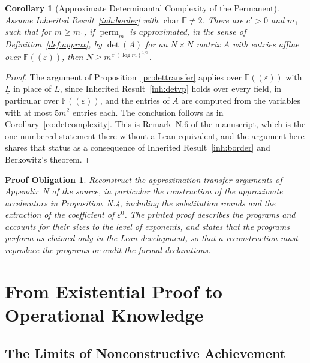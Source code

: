\documentclass[11pt,letterpaper]{report}
\theoremstyle{plain}
\newtheorem{corollary}[theorem]{Corollary}
\newtheorem{obligation}[theorem]{Proof Obligation}
\theoremstyle{definition}
\theoremstyle{remark}
\DeclareMathOperator{\perm}{perm}
\begin{document}
\begin{corollary}[Approximate Determinantal Complexity of the Permanent]\label{co:borderdet}
Assume Inherited Result~\ref{inh:border} with $\operatorname{char}\mathbb F\ne2$. There are $c'>0$ and $m_1$ such that for $m\ge m_1$, if $\perm_m$ is approximated, in the sense of Definition~\ref{def:approx}, by $\det(A)$ for an $N\times N$ matrix $A$ with entries affine over $\mathbb F((\varepsilon))$, then $N\ge m^{c'(\log m)^{1/3}}$.
\end{corollary}
\begin{proof}
The argument of Proposition~\ref{pr:dettransfer} applies over $\mathbb F((\varepsilon))$ with $\underline L$ in place of $L$, since Inherited Result~\ref{inh:detvp} holds over every field, in particular over $\mathbb F((\varepsilon))$, and the entries of $A$ are computed from the variables with at most $5m^2$ entries each. The conclusion follows as in Corollary~\ref{co:detcomplexity}. This is Remark~N.6 of the manuscript, which is the one numbered statement there without a Lean equivalent, and the argument here shares that status as a consequence of Inherited Result~\ref{inh:border} and Berkowitz's theorem.
\end{proof}

\begin{obligation}\label{ob:approxacc}
Reconstruct the approximation-transfer arguments of Appendix~N of the source, in particular the construction of the approximate accelerators in Proposition~N.4, including the substitution rounds and the extraction of the coefficient of $\varepsilon^0$. The printed proof describes the programs and accounts for their sizes to the level of exponents, and states that the programs perform as claimed only in the Lean development, so that a reconstruction must reproduce the programs or audit the formal declarations.
\end{obligation}

\part{From Existential Proof to Operational Knowledge}

\chapter{The Limits of Nonconstructive Achievement}
\end{document}
